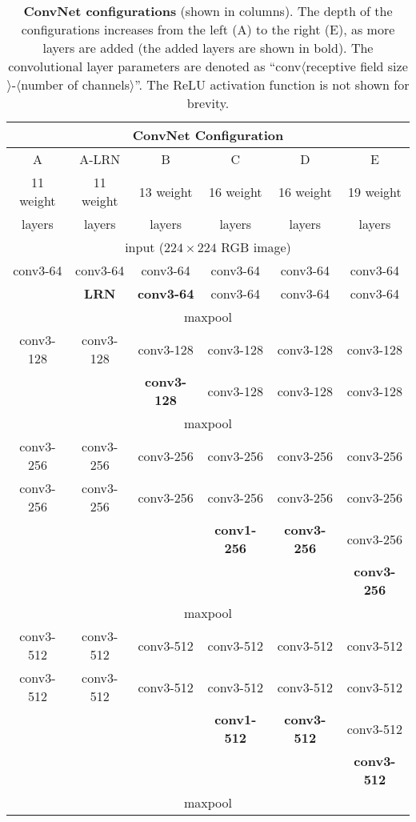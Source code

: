 \documentclass{article} %
\begin{document}
\begin{table}[htb]
\centering
\small
\caption{\textbf{ConvNet configurations} (shown in columns).
The depth of the configurations increases from the left (A) to the right (E), as more layers are added (the added layers are shown in bold).
The convolutional layer parameters are denoted as ``conv$\langle$receptive field size$\rangle$-$\langle$number of channels$\rangle$''.
The ReLU activation function is not shown for brevity.
}
\begin{tabular}{|c|c|c|c|c|c|} \hline
\multicolumn{6}{|c|}{{ConvNet Configuration}} \\ \hline
A & A-LRN & B & C & D & E \\ \hline
11 weight & 11 weight & 13 weight & 16 weight & 16 weight & 19 weight \\ 
layers & layers & layers & layers & layers & layers \\ \hline\hline
\multicolumn{6}{|c|}{input ($224 \times 224$ RGB image)} \\ \hline
conv3-64 & conv3-64 & conv3-64 & conv3-64 & conv3-64 & conv3-64 \\ 
 & \textbf{LRN} & \textbf{conv3-64} & conv3-64 & conv3-64 & conv3-64\\ \hline
\multicolumn{6}{|c|}{maxpool} \\ \hline
conv3-128 & conv3-128 & conv3-128 & conv3-128 & conv3-128 & conv3-128 \\ 
 & & \textbf{conv3-128} & conv3-128 & conv3-128 & conv3-128 \\ \hline
\multicolumn{6}{|c|}{maxpool} \\ \hline
conv3-256 & conv3-256 & conv3-256 & conv3-256 & conv3-256 & conv3-256 \\ 
conv3-256 & conv3-256 & conv3-256 & conv3-256 & conv3-256 & conv3-256 \\ 
& & & \textbf{conv1-256} & \textbf{conv3-256} & conv3-256 \\ 
& & & & & \textbf{conv3-256} \\ \hline
\multicolumn{6}{|c|}{maxpool} \\ \hline
conv3-512 & conv3-512 & conv3-512 & conv3-512 & conv3-512 & conv3-512 \\ 
conv3-512 & conv3-512 & conv3-512 & conv3-512 & conv3-512 & conv3-512 \\ 
& & & \textbf{conv1-512} & \textbf{conv3-512} & conv3-512 \\ 
& & & & & \textbf{conv3-512} \\ \hline
\multicolumn{6}{|c|}{maxpool} \\ \hline

\end{tabular}
\end{table}
\end{document}
